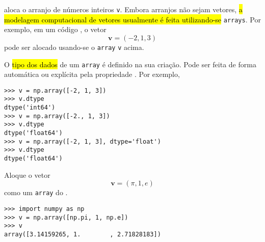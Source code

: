 aloca o arranjo de números inteiros \lstinline+v+. Embora arranjos não sejam vetores, \hl{a modelagem computacional de vetores usualmente é feita utilizando-se} \texttt{arrays}. Por exemplo, em um código {\python}, o vetor
\begin{equation}
  \pmb{v} = (-2, 1, 3)
\end{equation}
pode ser alocado usando-se o \texttt{array} \lstinline+v+ acima.

O \hl{tipo dos dados} de um \lstinline+array+ é definido na sua criação. Pode ser feita de forma automática ou explícita pela propriedade {\PYTHONnumpyDOTdtype}. Por exemplo,

\begin{lstlisting}
>>> v = np.array([-2, 1, 3])
>>> v.dtype
dtype('int64')
>>> v = np.array([-2., 1, 3])
>>> v.dtype
dtype('float64')
>>> v = np.array([-2, 1, 3], dtype='float')
>>> v.dtype
dtype('float64')
\end{lstlisting}

\begin{ex}
  Aloque o vetor
  \begin{equation}
    \pmb{v} = (\pi, 1, e)
  \end{equation}
  como um \lstinline+array+ do {\numpy}.

\begin{lstlisting}
>>> import numpy as np
>>> v = np.array([np.pi, 1, np.e])
>>> v
array([3.14159265, 1.        , 2.71828183])
\end{lstlisting}

\end{ex}

